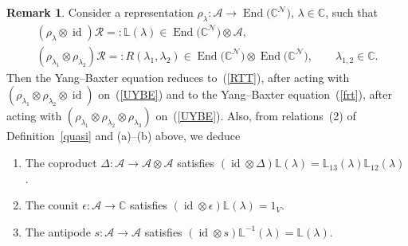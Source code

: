 \documentclass[pdftex]{sigma}
\numberwithin{equation}{section}
\theoremstyle{definition}
\newtheorem{rem}[thm]{Remark}
\newcommand{\id}{\operatorname{id}}
\DeclareMathOperator{\EEnd}{End}%
\begin{document}
\begin{rem} \label{remy} Consider a representation $\rho_{\lambda}\colon \mathcal{A} \to \EEnd\bigl({\mathbb C}^{\mathcal N}\bigr)$, $\lambda \in {\mathbb C}$, such that
\begin{gather*}
(\rho_{\lambda} \otimes \id){\mathcal R} =: {\mathbb L}(\lambda) \in \EEnd\bigl({\mathbb C}^{\mathcal N}\bigr) \otimes \mathcal{A},\\
(\rho_{\lambda_1} \otimes \rho_{\lambda_2}){\mathcal R} =: R(\lambda_1, \lambda_2)\in \EEnd\bigl({\mathbb C}^{\mathcal N}\bigr) \otimes \EEnd\bigl({\mathbb C}^{\mathcal N}\bigr), \qquad \lambda_{1,2} \in {\mathbb C}.
\end{gather*}
 Then the Yang--Baxter equation reduces to~(\ref{RTT}), after acting with $(\rho_{\lambda_1} \otimes \rho_{\lambda_2} \otimes \id)$ on~(\ref{UYBE}) and to the Yang--Baxter equation~(\ref{frt}), after acting with $(\rho_{\lambda_1} \otimes \rho_{\lambda_2} \otimes \rho_{\lambda_3})$ on~(\ref{UYBE}).
Also, from relations~(2) of Definition~\ref{quasi} and (a)--(b) above, we deduce
\begin{enumerate}\itemsep=0pt
 \item[{(i)}] The coproduct $\Delta\colon \mathcal{A} \to \mathcal{A} \otimes \mathcal{A}$ satisfies $(\id \otimes \Delta){\mathbb L}(\lambda) ={\mathbb L}_{13}(\lambda) {\mathbb L}_{12}(\lambda)$.
\item[{(ii)}] The counit $\epsilon\colon \mathcal{A} \to {\mathbb C}$ satisfies $(\id \otimes \epsilon) {\mathbb L}(\lambda) = 1_{V}$.
\item[{(iii)}] The antipode $s\colon \mathcal{A} \to \mathcal{A}$ satisfies $(\id \otimes s){\mathbb L}^{-1}(\lambda) ={\mathbb L}(\lambda)$.
\end{enumerate}
\end{rem}
\end{document}
